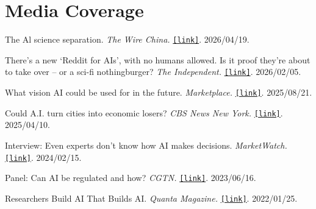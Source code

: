\if{}
\section{\sc Media Coverage}
\begin{list2}
\item The Al science separation. \textit{The Wire China.} \href{https://www.thewirechina.com/2026/04/19/the-ai-science-separation/}{\texttt{[link]}}. 2026/04/19.
\item There’s a new ‘Reddit for AIs’, with no humans allowed. Is it proof they’re about to take over – or a sci-fi nothingburger? \textit{The Independent.} \href{https://www.independent.co.uk/tech/moltbook-ai-social-media-reddit-b2913174.html}{\texttt{[link]}}. 2026/02/05.

\item What vision AI could be used for in the future. \textit{Marketplace.} \href{https://www.marketplace.org/story/2025/08/21/what-vision-ai-could-be-used-for-in-the-future}{\texttt{[link]}}. 2025/08/21.
\item Could A.I. turn cities into economic losers? \textit{CBS News New York.}
\href{https://www.cbsnews.com/newyork/video/could-a-i-turn-cities-into-economic-losers/}{\texttt{[link]}}.
2025/04/10.
\item Interview: Even experts don't know how AI makes decisions. \textit{MarketWatch.} \href{https://www.marketwatch.com/video/ai-promise-or-peril/even-experts-dont-know-how-ai-makes-decisions/4935DB8E-B7CD-406B-BBD4-A75E1364F0E8.html}{\texttt{[link]}}. 2024/02/15.
\item Panel: Can AI be regulated and how? \textit{CGTN.} \href{https://radio.cgtn.com/podcast/news/1/Panel-Can-AI-be-regulated-and-how/422124}{\texttt{[link]}}. 2023/06/16.
\item Researchers Build AI That Builds AI. \textit{Quanta Magazine.} \href{https://www.quantamagazine.org/researchers-build-ai-that-builds-ai-20220125/}{\texttt{[link]}}. 2022/01/25.




\end{list2}
\fi